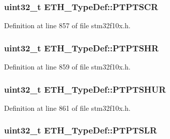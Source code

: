 \subsubsection[{\texorpdfstring{P\+T\+P\+T\+S\+CR}{PTPTSCR}}]{ {\bf uint32\+\_\+t} E\+T\+H\+\_\+\+Type\+Def\+::\+P\+T\+P\+T\+S\+CR}\hypertarget{struct_e_t_h___type_def_a09c223e5355a8c5885f3e168dd568079}{}\label{struct_e_t_h___type_def_a09c223e5355a8c5885f3e168dd568079}


Definition at line 857 of file stm32f10x.\+h.

\subsubsection[{\texorpdfstring{P\+T\+P\+T\+S\+HR}{PTPTSHR}}]{ {\bf uint32\+\_\+t} E\+T\+H\+\_\+\+Type\+Def\+::\+P\+T\+P\+T\+S\+HR}\hypertarget{struct_e_t_h___type_def_a30881f198009fd17e28644d9449045f5}{}\label{struct_e_t_h___type_def_a30881f198009fd17e28644d9449045f5}


Definition at line 859 of file stm32f10x.\+h.

\subsubsection[{\texorpdfstring{P\+T\+P\+T\+S\+H\+UR}{PTPTSHUR}}]{ {\bf uint32\+\_\+t} E\+T\+H\+\_\+\+Type\+Def\+::\+P\+T\+P\+T\+S\+H\+UR}\hypertarget{struct_e_t_h___type_def_a5e5c20f4ddc155ec5c7f976ebfb60c2a}{}\label{struct_e_t_h___type_def_a5e5c20f4ddc155ec5c7f976ebfb60c2a}


Definition at line 861 of file stm32f10x.\+h.

\subsubsection[{\texorpdfstring{P\+T\+P\+T\+S\+LR}{PTPTSLR}}]{ {\bf uint32\+\_\+t} E\+T\+H\+\_\+\+Type\+Def\+::\+P\+T\+P\+T\+S\+LR}\hypertarget{struct_e_t_h___type_def_a56638794c54141bb1b8ef6ac31a6997d}{}\label{struct_e_t_h___type_def_a56638794c54141bb1b8ef6ac31a6997d}


